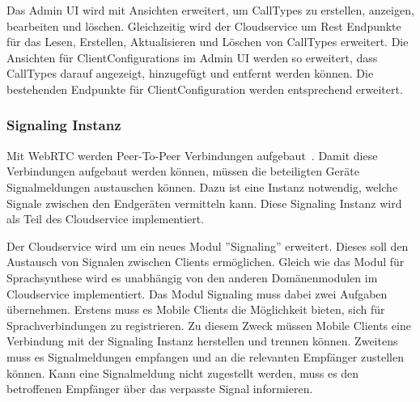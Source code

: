 Das Admin UI wird mit Ansichten erweitert, um CallTypes zu erstellen, anzeigen, bearbeiten und löschen.
Gleichzeitig wird der Cloudservice um Rest Endpunkte für das Lesen, Erstellen, Aktualisieren und Löschen von CallTypes erweitert.
Die Ansichten für ClientConfigurations im Admin UI werden so erweitert, dass CallTypes darauf angezeigt, hinzugefügt und entfernt werden können.
Die bestehenden Endpunkte für ClientConfiguration werden entsprechend erweitert.

\clearpage

\subsubsection{Signaling Instanz}

Mit WebRTC werden Peer-To-Peer Verbindungen aufgebaut~\cite{webrtc}.
Damit diese Verbindungen aufgebaut werden können, müssen die beteiligten Geräte Signalmeldungen austauschen können.
Dazu ist eine Instanz notwendig, welche Signale zwischen den Endgeräten vermitteln kann.
Diese Signaling Instanz wird als Teil des Cloudservice implementiert.


Der Cloudservice wird um ein neues Modul ''Signaling'' erweitert.
Dieses soll den Austausch von Signalen zwischen Clients ermöglichen.
Gleich wie das Modul für Sprachsynthese wird es unabhängig von den anderen Domänenmodulen im Cloudservice implementiert.
Das Modul Signaling muss dabei zwei Aufgaben übernehmen.
Erstens muss es Mobile Clients die Möglichkeit bieten, sich für Sprachverbindungen zu registrieren.
Zu diesem Zweck müssen Mobile Clients eine Verbindung mit der Signaling Instanz herstellen und trennen können.
Zweitens muss es Signalmeldungen empfangen und an die relevanten Empfänger zustellen können.
Kann eine Signalmeldung nicht zugestellt werden, muss es den betroffenen Empfänger über das verpasste Signal informieren.

